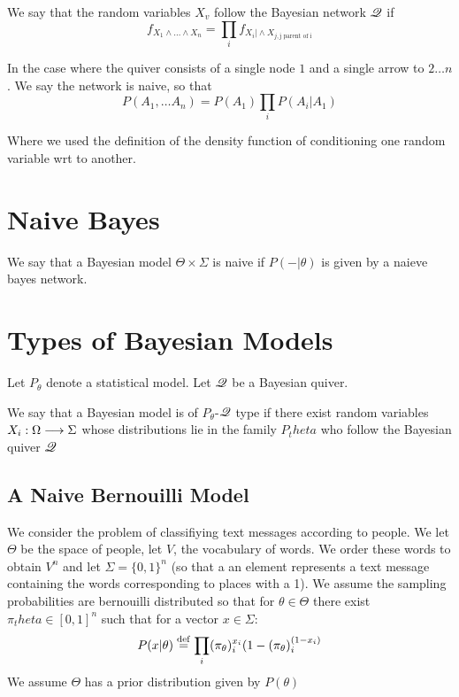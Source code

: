 \begin{definition}
We say that the random variables $X_v$ follow the Bayesian network $\Qvr$ if
\[
f_{X_1\wedge \ldots \wedge X_n}=\prod_i f_{X_i \vert \wedge X_{j, \textrm{j parent of i}}}\]
\end{definition}
In the case where the quiver consists of a single node $1$ and a single arrow to $2\ldots n$. We say the network is naive, so that
\[
P(A_1,\ldots A_n)=P(A_1)\prod_i P(A_i\vert A_1)
\]

Where we used the definition of the density function of conditioning one random variable wrt to another.
\section{Naive Bayes}

\begin{definition}
We say that a Bayesian model $\Theta \times \Sigma$ 	is naive if $P(-\vert \theta)$ is given by a naieve bayes network.
\end{definition}



\section{Types of Bayesian Models}

Let $P_\theta$ denote a statistical model. Let $\Qvr$ be a Bayesian quiver.

\begin{definition}
We say that a Bayesian model is of $P_\theta$-$\Qvr$ type if there exist random variables $X_i:\Omega	\longrightarrow \Sigma$ whose distributions lie in the family $P_theta$ who follow the Bayesian quiver $\Qvr$
\end{definition}



\subsection{A Naive Bernouilli Model}

We consider the problem of classifiying text messages according to people. We let $\Theta$ be the space of people, let $V$, the vocabulary of words. We order these words to obtain $V^n$ and  let $\Sigma=\{0,1\}^n$ (so that a an element represents a text message containing the words corresponding to places with a 1). We assume the sampling probabilities are bernouilli distributed so that for $\theta \in \Theta$ there exist $\pi_theta \in [0,1]^n$ such that for a vector $x \in \Sigma$:
\[
P(x\vert \theta)\stackrel{\operatorname{def}}{=} \prod_i (\pi_\theta)_i^{x_i} (1-(\pi_\theta)_i^{(1-x_i)}
\]
We assume $\Theta$ has a prior distribution given by $P(\theta)$

